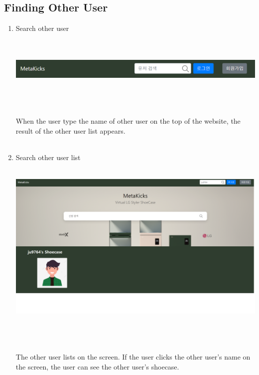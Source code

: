 \documentclass[conference]{IEEEtran}
\begin{document}
\subsection{Finding Other User}
\begin{enumerate}
	\item Search other user\\\\
\\\centerline{\includegraphics[scale=0.32]{pics/nav_bar.png}}\\\\
\\When the user type the name of other user on the top of the website, the result of the other user list appears.\\\\
	\item Search other user list\\
\\\centerline{\includegraphics[scale=0.19]{pics/user_list.png}}\\\\
\\The other user lists on the screen. If the user clicks the other user's name on the screen, the user can see the other user's shoecase.\\\\
\end{enumerate}
\end{document}
